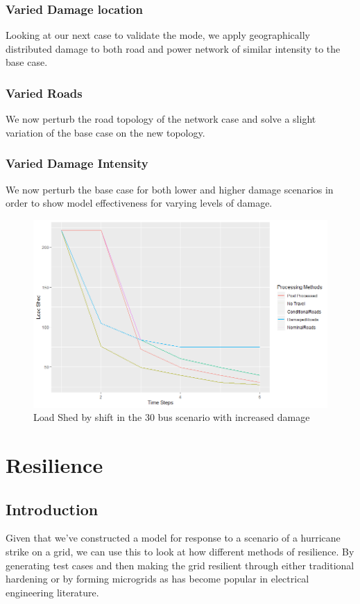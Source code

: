 \documentclass{article}
\begin{document}
	
	\subsubsection{Varied Damage location}
	Looking at our next case to validate the mode, we apply geographically distributed damage to both road and power network of similar intensity to the base case.
	
	\subsubsection{Varied Roads}
	We now perturb the road topology of the network case and solve a slight variation of the base case on the new topology.
	
	\subsubsection{Varied Damage Intensity}
	We now perturb the base case for both lower and higher damage scenarios in order to show model effectiveness for varying levels of damage.
	\begin{figure}[H]
		\centering
		\includegraphics[width=.9\linewidth]{Rplot30scenario2.png}
		\caption{Load Shed by shift in the 30 bus scenario with increased damage}
		\label{fig:sub2}
		
		
	\end{figure}

	\section{Resilience}
	\subsection{Introduction}
	Given that we've constructed a model for response to a scenario of a hurricane strike on a grid, we can use this to look at how different methods of resilience. By generating test cases and then making the grid resilient through either traditional hardening or by forming microgrids as has become popular in electrical engineering literature.
\end{document}
